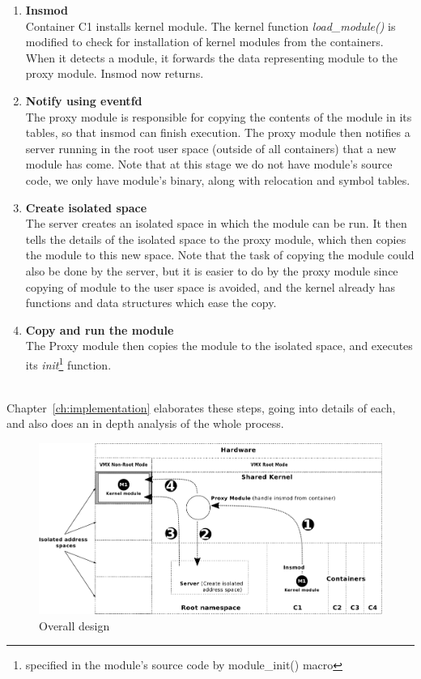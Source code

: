 \documentclass[twoside]{iitbreport}
\begin{document}
\begin{enumerate}
\item \textbf{Insmod}\\
Container C1 installs kernel module. The kernel function \textit{load\_module()} is modified to check for installation of kernel modules from the containers. When it detects a module, it forwards the data representing module to the proxy module. Insmod now returns.
\item \textbf{Notify using eventfd}\\
The proxy module is responsible for copying the contents of the module in its tables, so that insmod can finish execution. The proxy module then notifies a server running in the root user space (outside of all containers) that a new module has come. Note that at this stage we do not have module's source code, we only have module's binary, along with relocation and symbol tables.
\item \textbf{Create isolated space}\\
The server creates an isolated space in which the module can be run.
It then tells the details of the isolated space to the proxy module, which then copies the module to this new space. Note that the task of copying the module could also be done by the server, but it is easier to do by the proxy module since copying of module to the user space is avoided, and the kernel already has functions and data structures which ease the copy.
\item \textbf{Copy and run the module}\\
The Proxy module then copies the module to the isolated space, and executes its \textit{init}\footnote{specified in the module's source code by module\_init() macro} function. \\\\
\end{enumerate}

Chapter~\ref{ch:implementation} elaborates these steps, going into details of each, and also does an in depth analysis of the whole process.

\begin{figure}[ht]
\centering
\includegraphics[width=\textwidth]{design}
\caption{Overall design\label{fig:overallDesign1}}
\end{figure}
\end{document}
